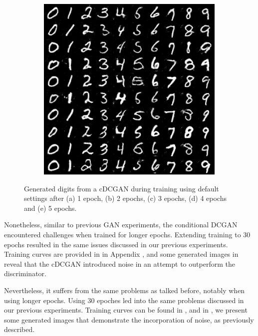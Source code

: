 \begin{figure}[H]
\begin{subfigure}{0.2\textwidth}
        \caption{}
        \label{subfig:cDCGAN/fake_sample_epoch_0004}
    \end{subfigure}%
    \begin{subfigure}{0.2\textwidth}
        \centering
        \includegraphics[width=0.95\linewidth]{cDCGAN/fake_sample_epoch_0005.png}
        \caption{}
        \label{subfig:cDCGAN/fake_sample_epoch_0005}
    \end{subfigure}

    \caption{Generated digits from a cDCGAN during training using default settings after (a) 1 epoch, (b) 2 epochs, (c) 3 epochs, (d) 4 epochs and (e) 5 epochs.}
    \label{fig:cDCGAN_default}
\end{figure}

Nonetheless, similar to previous GAN experiments, the conditional DCGAN encountered challenges when trained for longer epochs. Extending training to 30 epochs resulted in the same issues discussed in our previous experiments. Training curves are provided in  in Appendix , and some generated images in  reveal that the cDCGAN introduced noise in an attempt to outperform the discriminator.

Nevertheless, it suffers from the same problems as talked before, notably when using longer epochs. Using 30 epoches led into the same problems discussed in our previous experiments. Training curves can be found in , and in , we present some generated images that demonstrate the incorporation of noise, as previously described.

